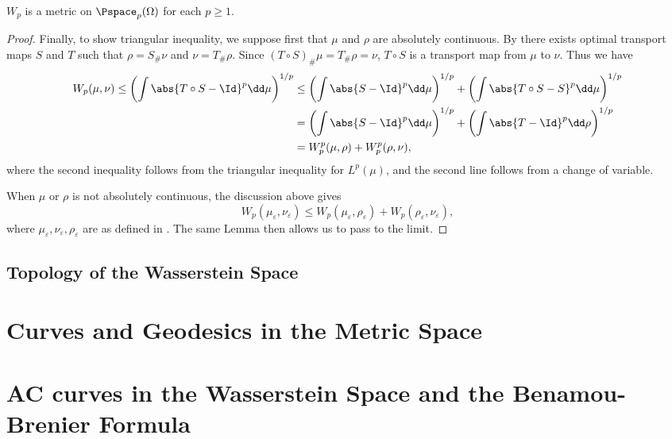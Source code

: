 \documentclass[oneside,reqno,letterpaper]{amsart}
\begin{document}
\begin{theorem}
  \(W_p\) is a metric on \(\Pspace_p(\Omega)\) for each \(p \geq 1\).
\end{theorem}
\begin{proof}
  Finally, to show triangular inequality, we suppose first that \(\mu\) and \(\rho\) are absolutely continuous.
  By  there exists optimal transport maps \(S\) and \(T\) such that \(\rho = S_{\#} \nu\) and \(\nu = T_{\#} \rho\).
  Since \((T \circ S)_{\#} \mu = T_{\#} \rho = \nu\), \(T \circ S\) is a transport map from \(\mu\) to \(\nu\).
  Thus we have
  \begin{align*}
    W_p(\mu, \nu)
    \leq \left( \int \abs{T \circ S - \Id}^p \dd \mu \right)^{1 / p}
    &\leq \left( \int \abs{S - \Id}^p \dd \mu \right)^{1 / p} + \left( \int \abs{T \circ S - S}^p \dd \mu \right)^{1 / p} \\
    &= \left( \int \abs{S - \Id}^p \dd \mu \right)^{1 / p} + \left( \int \abs{T - \Id}^p \dd \rho \right)^{1 / p} \\
    &= W_p^p(\mu, \rho) + W_p^p(\rho, \nu),
  \end{align*}
  where the second inequality follows from the triangular inequality for \(L^p(\mu)\), and the second line follows from a change of variable.

  When \(\mu\) or \(\rho\) is not absolutely continuous, the discussion above gives
  \[
    W_p(\mu_{\varepsilon}, \nu_{\varepsilon})
    \leq W_p(\mu_{\varepsilon}, \rho_{\varepsilon}) + W_p(\rho_{\varepsilon}, \nu_{\varepsilon}),
  \]
  where \(\mu_{\varepsilon}, \nu_{\varepsilon}, \rho_{\varepsilon}\) are as defined in .
  The same Lemma then allows us to pass to the limit.
\end{proof}


\subsection{Topology of the Wasserstein Space}






\section{Curves and Geodesics in the Metric Space}




\section{AC curves in the Wasserstein Space and the Benamou-Brenier Formula}
\end{document}

